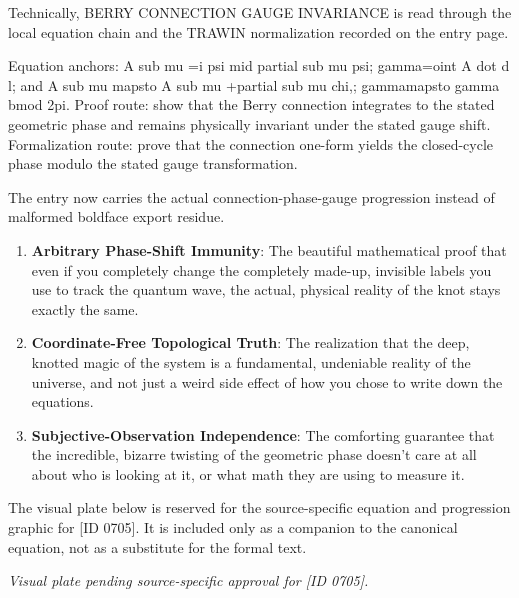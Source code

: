 Technically, BERRY CONNECTION GAUGE INVARIANCE is read through the local equation chain and the TRAWIN normalization recorded on the entry page.

Equation anchors: A sub mu =i psi mid partial sub mu psi; gamma=oint A dot d l; and A sub mu mapsto A sub mu +partial sub mu chi,; gammamapsto gamma bmod 2pi. Proof route: show that the Berry connection integrates to the stated geometric phase and remains physically invariant under the stated gauge shift. Formalization route: prove that the connection one-form yields the closed-cycle phase modulo the stated gauge transformation.

The entry now carries the actual connection-phase-gauge progression instead of malformed boldface export residue.
\endgroup

\begin{enumerate}[leftmargin=1.6em,itemsep=6pt,topsep=4pt]
\item \textbf{Arbitrary Phase-Shift Immunity}: The beautiful mathematical proof that even if you completely change the completely made-up, invisible labels you use to track the quantum wave, the actual, physical reality of the knot stays exactly the same.
\item \textbf{Coordinate-Free Topological Truth}: The realization that the deep, knotted magic of the system is a fundamental, undeniable reality of the universe, and not just a weird side effect of how you chose to write down the equations.
\item \textbf{Subjective-Observation Independence}: The comforting guarantee that the incredible, bizarre twisting of the geometric phase doesn't care at all about who is looking at it, or what math they are using to measure it.
\end{enumerate}

\begingroup\footnotesize\sloppy
The visual plate below is reserved for the source-specific equation and progression graphic for [ID 0705]. It is included only as a companion to the canonical equation, not as a substitute for the formal text.
\par\endgroup
\begingroup\footnotesize\itshape
Visual plate pending source-specific approval for [ID 0705].
\par\endgroup

